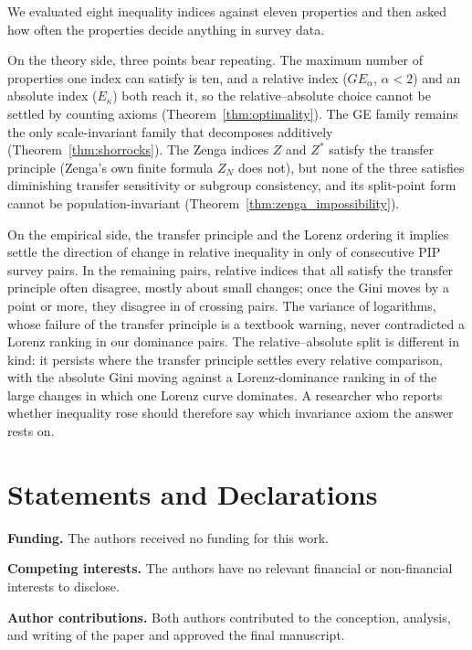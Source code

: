 \documentclass[12pt]{article}
\theoremstyle{plain}
\theoremstyle{definition}
\theoremstyle{remark}
\begin{document}
We evaluated eight inequality indices against eleven properties and then asked how often the properties decide anything in survey data.

On the theory side, three points bear repeating.
The maximum number of properties one index can satisfy is ten, and a relative index ($GE_\alpha$, $\alpha < 2$) and an absolute index ($E_\kappa$) both reach it, so the relative--absolute choice cannot be settled by counting axioms (Theorem~\ref{thm:optimality}).
The GE family remains the only scale-invariant family that decomposes additively (Theorem~\ref{thm:shorrocks}).
The Zenga indices $Z$ and $Z^*$ satisfy the transfer principle (Zenga's own finite formula $Z_N$ does not), but none of the three satisfies diminishing transfer sensitivity or subgroup consistency, and its split-point form cannot be population-invariant (Theorem~\ref{thm:zenga_impossibility}).

On the empirical side, the transfer principle and the Lorenz ordering it implies settle the direction of change in relative inequality in only \PipShareDom{} of consecutive PIP survey pairs.
In the remaining pairs, relative indices that all satisfy the transfer principle often disagree, mostly about small changes; once the Gini moves by a point or more, they disagree in \PipTpDisMaterialCross{} of crossing pairs.
The variance of logarithms, whose failure of the transfer principle is a textbook warning, never contradicted a Lorenz ranking in our \PipNDom{} dominance pairs.
The relative--absolute split is different in kind: it persists where the transfer principle settles every relative comparison, with the absolute Gini moving against a Lorenz-dominance ranking in \PipRelAbsOppMaterialDom{} of the large changes in which one Lorenz curve dominates.
A researcher who reports whether inequality rose should therefore say which invariance axiom the answer rests on.


\section*{Statements and Declarations}

\noindent\textbf{Funding.} The authors received no funding for this work.

\noindent\textbf{Competing interests.} The authors have no relevant financial or non-financial interests to disclose.

\noindent\textbf{Author contributions.} Both authors contributed to the conception, analysis, and writing of the paper and approved the final manuscript.
\end{document}
